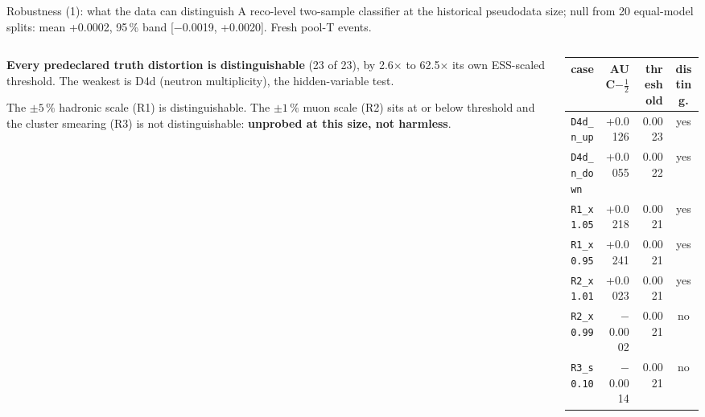 \documentclass[aspectratio=169,10pt]{beamer}
\def\evidencetext{}
\begin{document}
\gdef\evidencetext{\texttt{phase\_e/results/identifiability.json}}
\begin{frame}{Robustness (1): what the data can distinguish}
{\small A reco-level two-sample classifier at the historical pseudodata size; null from
20 equal-model splits: mean +0.0002, 95\,\% band
[\ensuremath{-}0.0019, +0.0020]. Fresh pool-T events.}\par\vspace{4pt}
\begin{columns}[T]
\begin{column}{0.47\linewidth}
\small \textbf{Every predeclared truth distortion is distinguishable} (23 of
23), by 2.6\ensuremath{\times} to 62.5\ensuremath{\times} its own ESS-scaled threshold.
The weakest is D4d (neutron multiplicity), the hidden-variable test.\par\vspace{4pt}
The $\pm5\,\%$ hadronic scale (R1) is distinguishable. The $\pm1\,\%$ muon scale (R2) sits at or below
threshold and the cluster smearing (R3) is not distinguishable: \textbf{unprobed at this size, not harmless}.
\end{column}
\begin{column}{0.5\linewidth}
{\footnotesize
\begin{tabular}{lrrc}
\toprule
case & AUC$-\frac{1}{2}$ & threshold & disting. \\
\midrule
\texttt{D4d\_n\_up} & +0.0126 & 0.0023 & yes \\
\texttt{D4d\_n\_down} & +0.0055 & 0.0022 & yes \\
\texttt{R1\_x1.05} & +0.0218 & 0.0021 & yes \\
\texttt{R1\_x0.95} & +0.0241 & 0.0021 & yes \\
\texttt{R2\_x1.01} & +0.0023 & 0.0021 & yes \\
\texttt{R2\_x0.99} & \ensuremath{-}0.0002 & 0.0021 & no \\
\texttt{R3\_s0.10} & \ensuremath{-}0.0014 & 0.0021 & no \\
\bottomrule
\end{tabular}}
\end{column}
\end{columns}
\end{frame}
\end{document}
